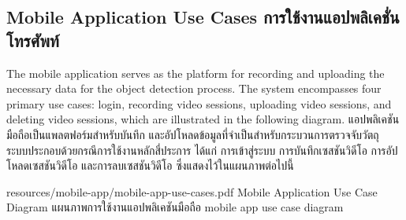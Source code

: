 \subsection{\ifenglish Mobile Application Use Cases \else การใช้งานแอปพลิเคชั่นโทรศัพท์ \fi}
\ifenglish
The mobile application serves as the platform for recording and uploading the necessary data for the object detection process. The system encompasses four primary use cases: login, recording video sessions, uploading video sessions, and deleting video sessions, which are illustrated in the following diagram.
\else
แอปพลิเคชันมือถือเป็นแพลตฟอร์มสำหรับบันทึก และอัปโหลดข้อมูลที่จำเป็นสำหรับกระบวนการตรวจจับวัตถุ ระบบประกอบด้วยกรณีการใช้งานหลักสี่ประการ ได้แก่ การเข้าสู่ระบบ การบันทึกเซสชันวิดีโอ การอัปโหลดเซสชันวิดีโอ และการลบเซสชันวิดีโอ ซึ่งแสดงไว้ในแผนภาพต่อไปนี้
\fi

\insertPDFfigure
{resources/mobile-app/mobile-app-use-cases.pdf}
{\ifenglish Mobile Application Use Case Diagram \else แผนภาพการใช้งานแอปพลิเคชันมือถือ \fi}
{mobile app use case diagram}

